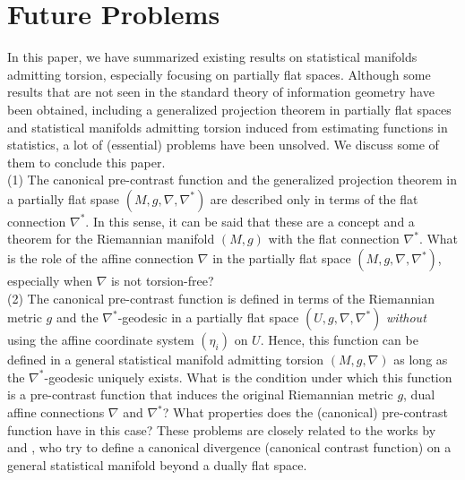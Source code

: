 \documentclass[graybox]{svmult}
\begin{document}
\section{Future Problems}
\label{sec:6}
In this paper, we have summarized existing results on statistical manifolds admitting
torsion, especially focusing on partially flat spaces. Although some results that are not
seen in the standard theory of information geometry have been obtained, including a
generalized projection theorem in partially flat spaces and statistical manifolds admitting
torsion induced from estimating functions in statistics, a lot of (essential) problems have
been unsolved. We discuss some of them to conclude this paper.
\vspace{3mm} \\
%
(1) The canonical pre-contrast function and the generalized projection theorem in a partially
    flat spase $(M,g,\nabla,\nabla^{\ast})$ are described only in terms of the flat connection
    $\nabla^{\ast}$. In this sense, it can be said that these are a concept and a theorem for
    the Riemannian manifold $(M,g)$ with the flat connection $\nabla^{\ast}$. What is the role
    of the affine connection $\nabla$ in the partially flat space $(M,g,\nabla,\nabla^{\ast})$,
    especially when $\nabla$ is not torsion-free? \vspace{2mm} \\
%
(2) The canonical pre-contrast function is defined in terms of the Riemannian metric $g$ and
    the $\nabla^{\ast}$-geodesic in a partially flat space $(U,g,\nabla,\nabla^{\ast})$
    {\it without} using the affine coordinate system $(\eta_i)$ on $U$.
    Hence, this function can be defined in a general statistical manifold admitting torsion
    $(M,g,\nabla)$ as long as the $\nabla^{\ast}$-geodesic uniquely exists.
    What is the condition under which this function is a pre-contrast function that induces
    the original Riemannian metric $g$, dual affine connections $\nabla$ and $\nabla^{\ast}$? 
    What properties does the (canonical) pre-contrast function have in this case?
    These problems are closely related to the works by \cite{HK} and \cite{AA}, who try to
    define a canonical divergence (canonical contrast function) on a general statistical
    manifold beyond a dually flat space. \vspace{2mm} \\
\end{document}
